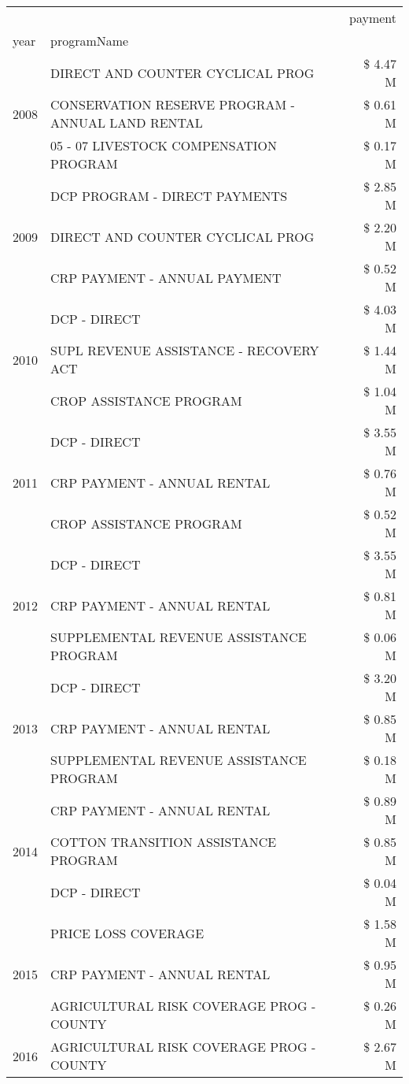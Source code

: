 \begin{tabular}{llr}
\toprule
 &  & payment \\
year & programName &  \\
\midrule
\multirow[t]{3}{*}{2008} & DIRECT AND COUNTER CYCLICAL PROG & \$ 4.47 M \\
 & CONSERVATION RESERVE PROGRAM - ANNUAL LAND RENTAL & \$ 0.61 M \\
 & 05 - 07 LIVESTOCK COMPENSATION PROGRAM & \$ 0.17 M \\
\cline{1-3}
\multirow[t]{3}{*}{2009} & DCP PROGRAM - DIRECT PAYMENTS & \$ 2.85 M \\
 & DIRECT AND COUNTER CYCLICAL PROG & \$ 2.20 M \\
 & CRP PAYMENT - ANNUAL PAYMENT & \$ 0.52 M \\
\cline{1-3}
\multirow[t]{3}{*}{2010} & DCP - DIRECT & \$ 4.03 M \\
 & SUPL REVENUE ASSISTANCE - RECOVERY ACT & \$ 1.44 M \\
 & CROP ASSISTANCE PROGRAM & \$ 1.04 M \\
\cline{1-3}
\multirow[t]{3}{*}{2011} & DCP - DIRECT & \$ 3.55 M \\
 & CRP PAYMENT - ANNUAL RENTAL & \$ 0.76 M \\
 & CROP ASSISTANCE PROGRAM & \$ 0.52 M \\
\cline{1-3}
\multirow[t]{3}{*}{2012} & DCP - DIRECT & \$ 3.55 M \\
 & CRP PAYMENT - ANNUAL RENTAL & \$ 0.81 M \\
 & SUPPLEMENTAL REVENUE ASSISTANCE PROGRAM & \$ 0.06 M \\
\cline{1-3}
\multirow[t]{3}{*}{2013} & DCP - DIRECT & \$ 3.20 M \\
 & CRP PAYMENT - ANNUAL RENTAL & \$ 0.85 M \\
 & SUPPLEMENTAL REVENUE ASSISTANCE PROGRAM & \$ 0.18 M \\
\cline{1-3}
\multirow[t]{3}{*}{2014} & CRP PAYMENT - ANNUAL RENTAL & \$ 0.89 M \\
 & COTTON TRANSITION ASSISTANCE PROGRAM & \$ 0.85 M \\
 & DCP - DIRECT & \$ 0.04 M \\
\cline{1-3}
\multirow[t]{3}{*}{2015} & PRICE LOSS COVERAGE & \$ 1.58 M \\
 & CRP PAYMENT - ANNUAL RENTAL & \$ 0.95 M \\
 & AGRICULTURAL RISK COVERAGE PROG - COUNTY & \$ 0.26 M \\
\cline{1-3}
\multirow[t]{3}{*}{2016} & AGRICULTURAL RISK COVERAGE PROG - COUNTY & \$ 2.67 M \\

\end{tabular}
